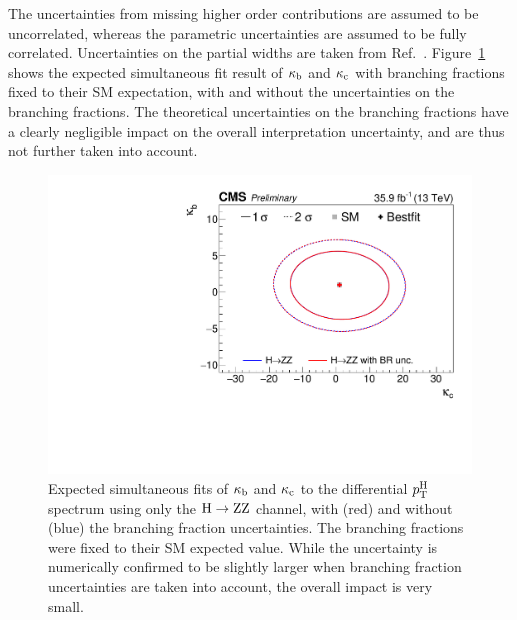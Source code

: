 The uncertainties from missing higher order contributions are assumed to be uncorrelated, whereas the parametric uncertainties are assumed to be fully correlated.
% 
Uncertainties on the partial widths are taken from Ref.~\cite{deFlorian:2016spz}.
% 
Figure~\ref{fig:kbkc-brcomparison} shows the expected simultaneous fit result of $\kappa_{\mathrm{b}}$ and $\kappa_{\mathrm{c}}$ with branching fractions fixed to their SM expectation, with and without the uncertainties on the branching fractions.
% 
The theoretical uncertainties on the branching fractions have a clearly negligible impact on the overall interpretation uncertainty, and are thus not further taken into account.


\begin{figure}[hbtp]
  \begin{center}
    \includegraphics[width=\halflinewidth]{img/interpretation/other/multicont_Yukawa_compareBRuncertainties_asimov.pdf}
    \caption{
        Expected simultaneous fits of $\kappa_{\mathrm{b}}$ and $\kappa_{\mathrm{c}}$ to the differential $p_\mathrm{T}^\mathrm{H}$ spectrum using only the $\mathrm{H}\to\mathrm{Z}\mathrm{Z}$ channel, with (red) and without (blue) the branching fraction uncertainties.
        The branching fractions were fixed to their SM expected value.
        While the uncertainty is numerically confirmed to be slightly larger when branching fraction uncertainties are taken into account, the overall impact is very small.
        }
    \label{fig:kbkc-brcomparison}
  \end{center}
\end{figure}

